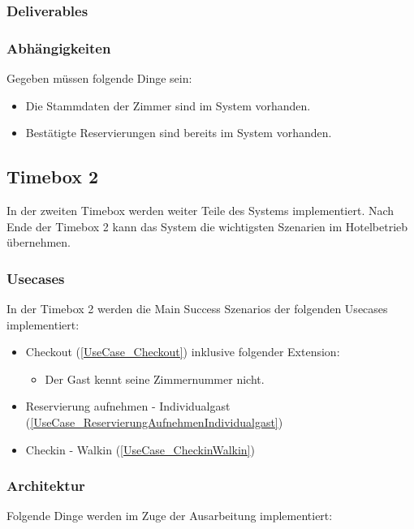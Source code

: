 \subsubsection{Deliverables}

\subsubsection{Abhängigkeiten}
Gegeben müssen folgende Dinge sein:

\begin{itemize}
	\item Die Stammdaten der Zimmer sind im System vorhanden.
	\item Bestätigte Reservierungen sind bereits im System vorhanden.
\end{itemize}

\subsection{Timebox 2}
In der zweiten Timebox werden weiter Teile des Systems implementiert.
Nach Ende der Timebox 2 kann das System die wichtigsten Szenarien im Hotelbetrieb übernehmen.

\subsubsection{Usecases}
In der Timebox 2 werden die Main Success Szenarios der folgenden Usecases implementiert:

\begin{itemize}
	\item Checkout (\ref{UseCase_Checkout}) inklusive folgender Extension:
	\begin{itemize}
		\item Der \Gls{Gast} kennt seine \Gls{Zimmernummer} nicht.
	\end{itemize}
	\item Reservierung aufnehmen - Individualgast (\ref{UseCase_ReservierungAufnehmenIndividualgast})
	\item Checkin - Walkin (\ref{UseCase_CheckinWalkin})
\end{itemize}

\subsubsection{Architektur}
Folgende Dinge werden im Zuge der Ausarbeitung implementiert:

